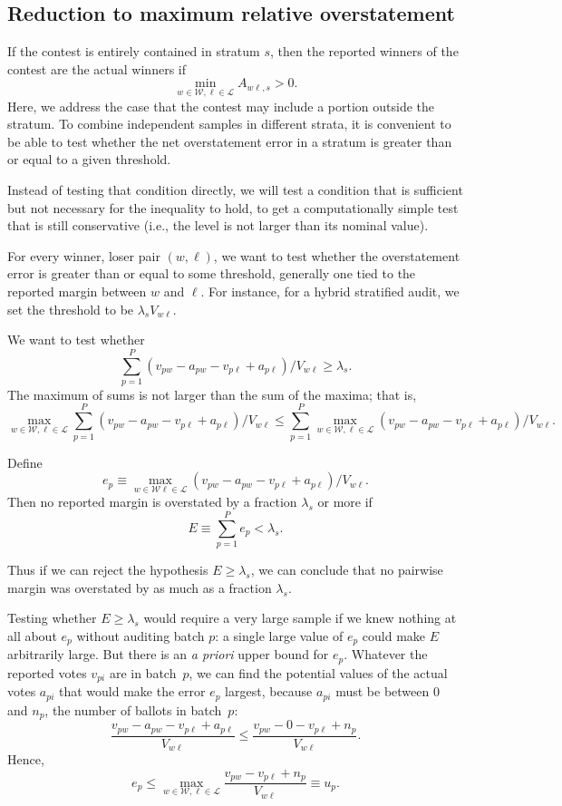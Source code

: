 \documentclass[runningheads]{llncs}
\begin{document}
\subsection{Reduction to maximum relative overstatement}
If the contest is entirely contained in stratum $s$, then
the reported winners of the contest are the actual winners if
$$ 
   \min_{w \in \mathcal{W}, \ell \in \mathcal{L}} A_{w\ell,s} > 0.
$$
Here, we address the case that the contest may include a portion outside the stratum.
To combine independent samples in different strata, it is convenient
to be able to test whether the net overstatement error in a stratum is greater than or equal to a given threshold.

Instead of testing that condition directly, we will test a condition that is sufficient 
but not necessary for the inequality to hold, to get a computationally simple test that
is still conservative (i.e., the level is not larger than its nominal value).

For every winner, loser pair $(w, \ell)$, we want to test
whether the overstatement error is greater than or equal to some threshold, generally
one tied to the reported margin between $w$ and $\ell$.
For instance, for a hybrid stratified audit, we set the threshold to be
$\lambda_s V_{w\ell}$.

We want to test whether
$$
   \sum_{p=1}^P (v_{pw}-a_{pw} - v_{p\ell} + a_{p\ell})/V_{w\ell} \ge \lambda_s.
$$
The maximum of sums is not larger than the sum of the maxima; that is,
$$
\max_{w \in \mathcal{W},  \ell \in \mathcal{L}}
   \sum_{p=1}^P (v_{pw}-a_{pw} - v_{p\ell} + a_{p\ell})/V_{w\ell}
   \le
  \sum_{p=1}^P  \max_{w \in \mathcal{W},  \ell \in \mathcal{L}} 
  (v_{pw}-a_{pw} - v_{p\ell} + a_{p\ell})/V_{w\ell}.
$$

Define 
$$
  e_p \equiv \max_{w \in \mathcal{W} \ell \in \mathcal{L}} 
     (v_{pw}-a_{pw} - v_{p\ell} + a_{p\ell})/V_{w\ell}.
$$
Then no reported margin is overstated by a fraction $\lambda_s$ or more
if 
$$ 
  E \equiv \sum_{p=1}^P e_p < \lambda_s.
$$

Thus if we can reject the hypothesis $E \ge \lambda_s$, we can conclude that
no pairwise margin was overstated by as much as a fraction $\lambda_s$.

Testing whether $E \ge \lambda_s$ would require a very large sample if we knew nothing at
all about $e_p$ without auditing batch $p$: a single large value of $e_p$ could make
$E$ arbitrarily large.
But there is an \emph{a priori} upper bound for $e_p$.
Whatever the reported votes $v_{pi}$ are in batch~$p$, we can find the
potential values of the actual votes $a_{pi}$ that would make the
error $e_p$ largest, because $a_{pi}$ must be between 0 and $n_p$,
the number of ballots in batch~$p$:
$$
    \frac{v_{pw}-a_{pw} - v_{p\ell} + a_{p\ell}}{V_{w\ell}} \le 
    \frac{v_{pw}- 0 - v_{p\ell} + n_p}{V_{w\ell}}.
$$
Hence,
\begin{equation} \label{eq:uDef}
    e_p \le \max_{w \in \mathcal{W}, \ell \in \mathcal{L}} 
    \frac{v_{pw} - v_{p\ell} + n_p}{V_{w\ell}} \equiv u_p.
\end{equation}
\end{document}
